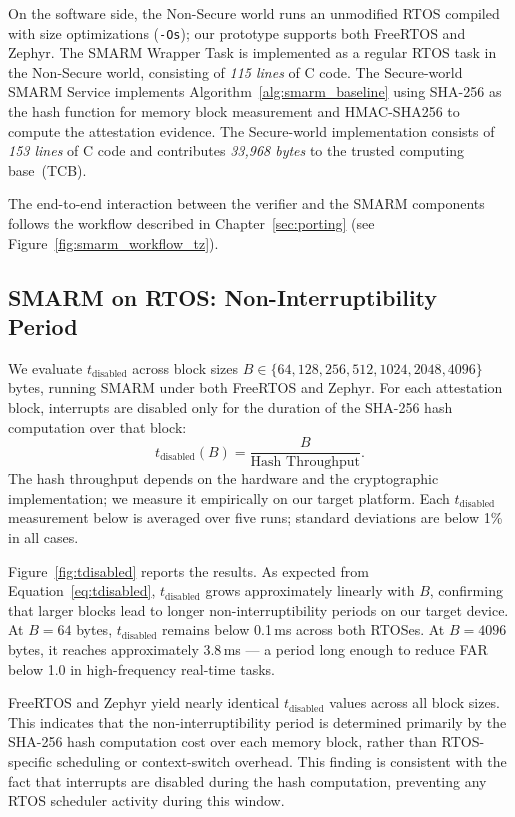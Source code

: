 \documentclass[a4paper,10pt]{article}
\begin{document}
{On the software side, the Non-Secure world runs an unmodified RTOS compiled 
with size optimizations (\texttt{-Os}); our prototype supports both FreeRTOS 
and Zephyr. The SMARM Wrapper Task is implemented as a regular RTOS task 
in the Non-Secure world, consisting of \textit{115 lines} of C code. The 
Secure-world SMARM Service implements Algorithm~\ref{alg:smarm_baseline} 
using SHA-256 as the hash function for memory block measurement and 
HMAC-SHA256 to compute the attestation evidence. The Secure-world 
implementation consists of \textit{153 lines} of C code and contributes 
\textit{33,968 bytes} to the trusted computing base~(TCB).

The end-to-end interaction between the verifier and the SMARM 
components follows the workflow described in 
Chapter~\ref{sec:porting} (see Figure~\ref{fig:smarm_workflow_tz}).


\subsection{SMARM on RTOS: Non-Interruptibility Period}
\label{sec:smarm-noninterrupt}

We evaluate $t_{\text{disabled}}$ across block sizes
$B \in \{64, 128, 256, 512, 1024, 2048, 4096\}$ bytes, running SMARM
under both FreeRTOS and Zephyr. For each attestation block, interrupts
are disabled only for the duration of the SHA-256 hash computation over
that block:
\begin{equation}
    t_{\text{disabled}}(B) = \frac{B}{\text{Hash Throughput}}.
    \label{eq:tdisabled}
\end{equation}
The hash throughput depends on the hardware and the cryptographic
implementation; we measure it empirically on our target platform.
Each $t_{\text{disabled}}$ measurement below is averaged over five runs;
standard deviations are below 1\% in all cases.

Figure~\ref{fig:tdisabled} reports the results. As expected from
Equation~\ref{eq:tdisabled}, $t_{\text{disabled}}$ grows approximately
linearly with $B$, confirming that larger blocks lead to longer
non-interruptibility periods on our target device.
At $B = 64$ bytes, $t_{\text{disabled}}$ remains below 0.1\,ms across
both RTOSes. At $B = 4096$ bytes, it reaches approximately 3.8\,ms — a
period long enough to reduce FAR below 1.0 in high-frequency real-time
tasks.

FreeRTOS and Zephyr yield nearly identical $t_{\text{disabled}}$ values
across all block sizes. This indicates that the non-interruptibility
period is determined primarily by the SHA-256 hash computation cost over
each memory block, rather than RTOS-specific scheduling or context-switch
overhead. This finding is consistent with the fact that interrupts are
disabled during the hash computation, preventing any RTOS scheduler
activity during this window.

}
\end{document}
